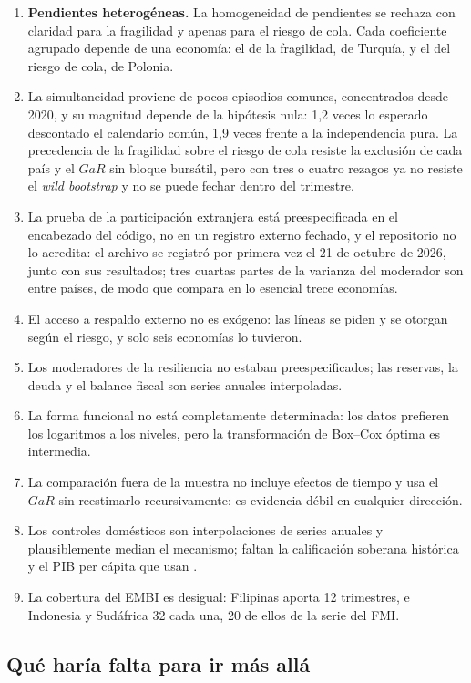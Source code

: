\begin{enumerate}
\item \textbf{Pendientes heterogéneas.} La homogeneidad de pendientes se rechaza con claridad para la fragilidad y apenas para el riesgo de cola. Cada coeficiente agrupado depende de una economía: el de la fragilidad, de Turquía, y el del riesgo de cola, de Polonia.
\item La simultaneidad proviene de pocos episodios comunes, concentrados desde 2020, y su magnitud depende de la hipótesis nula: 1,2 veces lo esperado descontado el calendario común, 1,9 veces frente a la independencia pura. La precedencia de la fragilidad sobre el riesgo de cola resiste la exclusión de cada país y el $GaR$ sin bloque bursátil, pero con tres o cuatro rezagos ya no resiste el \textit{wild bootstrap} y no se puede fechar dentro del trimestre.
\item La prueba de la participación extranjera está preespecificada en el encabezado del código, no en un registro externo fechado, y el repositorio no lo acredita: el archivo se registró por primera vez el 21 de octubre de 2026, junto con sus resultados; tres cuartas partes de la varianza del moderador son entre países, de modo que compara en lo esencial trece economías.
\item El acceso a respaldo externo no es exógeno: las líneas se piden y se otorgan según el riesgo, y solo seis economías lo tuvieron.
\item Los moderadores de la resiliencia no estaban preespecificados; las reservas, la deuda y el balance fiscal son series anuales interpoladas.
\item La forma funcional no está completamente determinada: los datos prefieren los logaritmos a los niveles, pero la transformación de Box--Cox óptima es intermedia.
\item La comparación fuera de la muestra no incluye efectos de tiempo y usa el $GaR$ sin reestimarlo recursivamente: es evidencia débil en cualquier dirección.
\item Los controles domésticos son interpolaciones de series anuales y plausiblemente median el mecanismo; faltan la calificación soberana histórica y el PIB per cápita que usan \citet{Chari2024b}.
\item La cobertura del EMBI es desigual: Filipinas aporta 12 trimestres, e Indonesia y Sudáfrica 32 cada una, 20 de ellos de la serie del FMI.
\end{enumerate}

\subsection{Qué haría falta para ir más allá}
\label{sec:agenda-futura}

